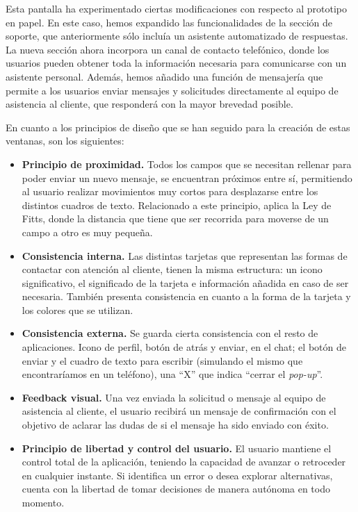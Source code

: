 Esta pantalla ha experimentado ciertas modificaciones con respecto al prototipo en papel. En este caso, hemos
expandido las funcionalidades de la sección de soporte, que anteriormente sólo incluía un asistente automatizado
de respuestas. La nueva sección ahora incorpora un canal de contacto telefónico, donde los usuarios pueden obtener
toda la información necesaria para comunicarse con un asistente personal. Además, hemos añadido una función de
mensajería que permite a los usuarios enviar mensajes y solicitudes directamente al equipo de asistencia al cliente,
que responderá con la mayor brevedad posible.

En cuanto a los principios de diseño que se han seguido para la creación de estas ventanas, son los siguientes:

\begin{itemize}
    \item \textbf{Principio de proximidad.} Todos los campos que se necesitan rellenar para poder enviar un nuevo
        mensaje, se encuentran próximos entre sí, permitiendo al usuario realizar movimientos muy cortos para
        desplazarse entre los distintos cuadros de texto. Relacionado a este principio, aplica la Ley de Fitts,
        donde la distancia que tiene que ser recorrida para moverse de un campo a otro es muy pequeña.
    \item \textbf{Consistencia interna.} Las distintas tarjetas que representan las formas de contactar con atención
        al cliente, tienen la misma estructura: un icono significativo, el significado de la tarjeta e información
        añadida en caso de ser necesaria. También presenta consistencia en cuanto a la forma de la tarjeta y los
        colores que se utilizan.
    \item \textbf{Consistencia externa.} Se guarda cierta consistencia con el resto de aplicaciones. Icono de
        perfil, botón de atrás y enviar, en el chat; el botón de enviar y el cuadro de texto para escribir (simulando
        el mismo que encontraríamos en un teléfono), una “X” que indica “cerrar el \textit{pop-up}”.
    \item \textbf{Feedback visual.} Una vez enviada la solicitud o mensaje al equipo de asistencia al cliente, el
        usuario recibirá un mensaje de confirmación con el objetivo de aclarar las dudas de si el mensaje ha sido
        enviado con éxito.
    \item \textbf{Principio de libertad y control del usuario.} El usuario mantiene el control total de la aplicación,
        teniendo la capacidad de avanzar o retroceder en cualquier instante. Si identifica un error o desea
        explorar alternativas, cuenta con la libertad de tomar decisiones de manera autónoma en todo momento.

\end{itemize}

